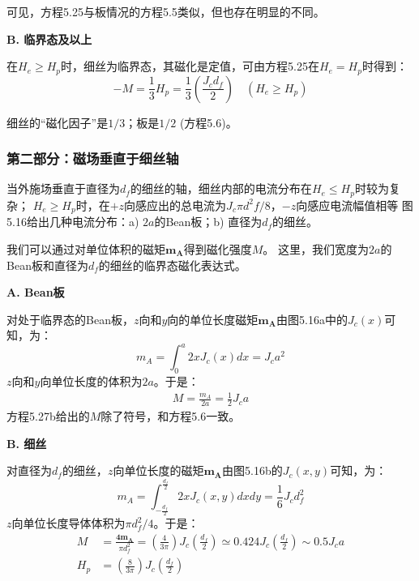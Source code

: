 可见，方程5.25与板情况的方程5.5类似，但也存在明显的不同。

\textbf{B. 临界态及以上}

在$H_e\ge H_p$时，细丝为临界态，其磁化是定值，可由方程5.25在$H_e=H_p$时得到：
\begin{equation}%
-M=\frac{1}{3}H_{p}=\frac{1}{3}(\frac{J_{c}d_{f}}{2})\quad(H_{e}\geq H_{p})
\end{equation}

细丝的“磁化因子”是$1/3$；板是$1/2$ (方程5.6)。

\subsubsection{第二部分：磁场垂直于细丝轴}
当外施场垂直于直径为$d_f$的细丝的轴，细丝内部的电流分布在$H_e\le H_p$时较为复杂；
$H_e\ge H_p$时，在$+z$向感应出的总电流为$J_c \pi d^2 f/8$，$-z$向感应电流幅值相等
图5.16给出几种电流分布：a) $2a$的Bean板；b) 直径为$d_f$的细丝。

我们可以通过对单位体积的磁矩$\mathbf{m_A}$得到磁化强度$M$。
这里，我们宽度为$2a$的Bean板和直径为$d_f$的细丝的临界态磁化表达式。

\textbf{A. Bean板}

对处于临界态的Bean板，$z$向和$y$向的单位长度磁矩$\mathbf{m_A}$由图5.16a中的$J_c(x)$可知，为：
\begin{equation}%
m_{A}=\int_{0}^{a}2xJ_{c}(x)dx=J_{c}a^{2}
\end{equation}
$z$向和$y$向单位长度的体积为$2a$。于是：
\begin{align*}%
M=\frac{m_{A}}{2a}=\frac{1}{2}J_{c}a \tag{5.27b}
\end{align*}
方程5.27b给出的$M$除了符号，和方程5.6一致。

\textbf{B. 细丝}

对直径为$d_f$的细丝，$z$向单位长度的磁矩$\mathbf{m_A}$由图5.16b的$J_c(x,y)$可知，为：
\begin{equation}%
m_{A}=\int_{-\frac{d_{f}}{2}}^{\frac{d_{f}}{2}}2xJ_{c}(x,y)dxdy=\frac{1}{6}J_{c}d_{f}^{2}
\end{equation}
$z$向单位长度导体体积为$\pi d_f^2/4$。于是：
\begin{subequations}
	\begin{align}
M&=\frac{\mathbf{4m_{A}}}{\pi d_{f}^{2}}=(\frac{4}{3\pi})J_{c}(\frac{d_{f}}{2})\simeq0.424J_{c}(\frac{d_{f}}{2})\sim0.5J_{c}a\\
H_{p}&=(\frac{8}{3\pi})J_{c}(\frac{d_{f}}{2})
	\end{align}
\end{subequations}

